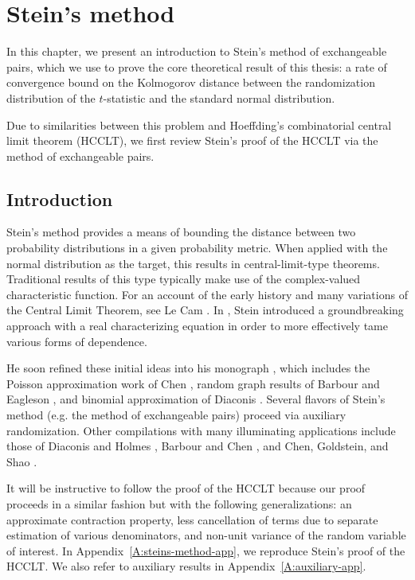 \chapter{Stein's method}
\label{C:steins-method}
In this chapter, we present an introduction to
Stein's method of exchangeable pairs, which we use to prove the core
theoretical result of this thesis: a rate of convergence bound on the
Kolmogorov distance between the randomization distribution of the $t$-statistic
and the standard normal distribution.

Due to similarities between this problem and Hoeffding's combinatorial central
limit theorem (HCCLT), we first review Stein's proof of the HCCLT via the method
of exchangeable pairs.

\section{Introduction}
\label{S:steins-method-introduction}
Stein's method provides a means of bounding the distance between two
probability distributions in a given probability metric.  When applied
with the normal distribution as the target, this results in
central-limit-type theorems.  Traditional results of this type
typically make use of the complex-valued characteristic function.  For
an account of the early history and many variations of the Central
Limit Theorem, see Le Cam \cite{cam1986central}.  In
\cite{stein1972bound}, Stein introduced a groundbreaking approach with
a real characterizing equation in order to more effectively tame
various forms of dependence.

He soon refined these initial ideas into his monograph
\cite{stein1986approximate}, which includes the Poisson approximation
work of Chen \cite{chen1975poisson}, random graph results of Barbour
and Eagleson \cite{barbour1985multiple}, and binomial approximation of
Diaconis \cite{diaconis1977distribution}.  Several flavors of Stein's
method (e.g. the method of exchangeable pairs) proceed via auxiliary
randomization.  Other compilations with many illuminating applications
include those of Diaconis and Holmes \cite{diaconis2004stein}, Barbour
and Chen \cite{barbour2005introduction, barbour2005stein}, and
Chen, Goldstein, and Shao \cite{chen2010normal}.

It will be instructive to follow the proof of the HCCLT
because our proof proceeds in a similar fashion but with the following
generalizations: an approximate contraction property, less
cancellation of terms due to separate estimation of various
denominators, and non-unit variance of the random variable of interest.
In Appendix~\ref{A:steins-method-app}, we reproduce
Stein's \cite{stein1986approximate} proof of the HCCLT.
We also refer to auxiliary results in Appendix~\ref{A:auxiliary-app}.

